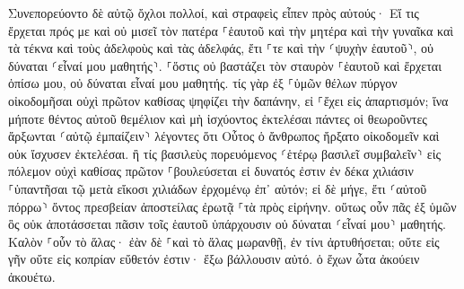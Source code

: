 \documentclass[twoside, 9pt]{extreport}
\begin{document}
Συνεπορεύοντο δὲ αὐτῷ ὄχλοι πολλοί, καὶ στραφεὶς εἶπεν πρὸς αὐτούς· 
Εἴ τις ἔρχεται πρός με καὶ οὐ μισεῖ τὸν πατέρα ⸀ἑαυτοῦ καὶ τὴν μητέρα καὶ τὴν γυναῖκα καὶ τὰ τέκνα καὶ τοὺς ἀδελφοὺς καὶ τὰς ἀδελφάς, ἔτι ⸀τε καὶ τὴν ⸂ψυχὴν ἑαυτοῦ⸃, οὐ δύναται ⸂εἶναί μου μαθητής⸃. 
⸀ὅστις οὐ βαστάζει τὸν σταυρὸν ⸀ἑαυτοῦ καὶ ἔρχεται ὀπίσω μου, οὐ δύναται εἶναί μου μαθητής. 
τίς γὰρ ἐξ ⸀ὑμῶν θέλων πύργον οἰκοδομῆσαι οὐχὶ πρῶτον καθίσας ψηφίζει τὴν δαπάνην, εἰ ⸀ἔχει εἰς ἀπαρτισμόν; 
ἵνα μήποτε θέντος αὐτοῦ θεμέλιον καὶ μὴ ἰσχύοντος ἐκτελέσαι πάντες οἱ θεωροῦντες ἄρξωνται ⸂αὐτῷ ἐμπαίζειν⸃ 
λέγοντες ὅτι Οὗτος ὁ ἄνθρωπος ἤρξατο οἰκοδομεῖν καὶ οὐκ ἴσχυσεν ἐκτελέσαι. 
ἢ τίς βασιλεὺς πορευόμενος ⸂ἑτέρῳ βασιλεῖ συμβαλεῖν⸃ εἰς πόλεμον οὐχὶ καθίσας πρῶτον ⸀βουλεύσεται εἰ δυνατός ἐστιν ἐν δέκα χιλιάσιν ⸀ὑπαντῆσαι τῷ μετὰ εἴκοσι χιλιάδων ἐρχομένῳ ἐπ᾽ αὐτόν; 
εἰ δὲ μήγε, ἔτι ⸂αὐτοῦ πόρρω⸃ ὄντος πρεσβείαν ἀποστείλας ἐρωτᾷ ⸀τὰ πρὸς εἰρήνην. 
οὕτως οὖν πᾶς ἐξ ὑμῶν ὃς οὐκ ἀποτάσσεται πᾶσιν τοῖς ἑαυτοῦ ὑπάρχουσιν οὐ δύναται ⸂εἶναί μου⸃ μαθητής. 
Καλὸν ⸀οὖν τὸ ἅλας· ἐὰν δὲ ⸀καὶ τὸ ἅλας μωρανθῇ, ἐν τίνι ἀρτυθήσεται; 
οὔτε εἰς γῆν οὔτε εἰς κοπρίαν εὔθετόν ἐστιν· ἔξω βάλλουσιν αὐτό. ὁ ἔχων ὦτα ἀκούειν ἀκουέτω. 
\end{document}
